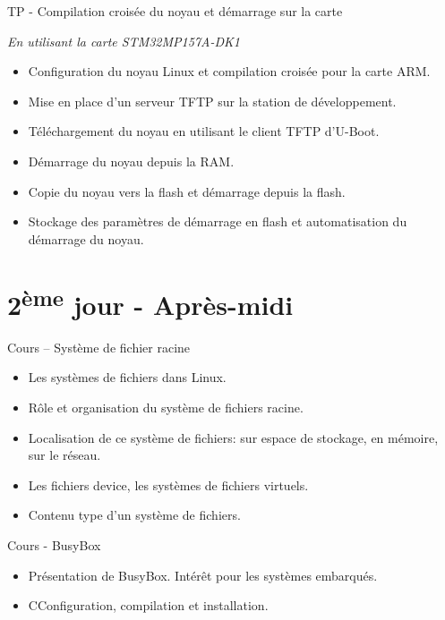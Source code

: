 \documentclass[a4paper,12pt,obeyspaces,spaces,hyphens]{article}
\begin{document}
\feagendaonecolumn
{TP - Compilation croisée du noyau et démarrage sur la carte}
{
  {\em En utilisant la carte STM32MP157A-DK1}
  \begin{itemize}
  \item Configuration du noyau Linux et compilation croisée pour la carte ARM.
  \item Mise en place d'un serveur TFTP sur la station de développement.
  \item Téléchargement du noyau en utilisant le client TFTP d'U-Boot.
  \item Démarrage du noyau depuis la RAM.
  \item Copie du noyau vers la flash et démarrage depuis la flash.
  \item Stockage des paramètres de démarrage en flash et automatisation
	du démarrage du noyau.
  \end{itemize}
}

\section{2\textsuperscript{ème} jour - Après-midi}

\feagendatwocolumn
{Cours – Système de fichier racine}
{
  \begin{itemize}
  \item Les systèmes de fichiers dans Linux.
  \item Rôle et organisation du système de fichiers racine.
  \item Localisation de ce système de fichiers: sur espace
	de stockage, en mémoire, sur le réseau.
  \item Les fichiers device, les systèmes de fichiers virtuels.
  \item Contenu type d'un système de fichiers.
  \end{itemize}
}
{Cours - BusyBox}
{
  \begin{itemize}
  \item Présentation de BusyBox. Intérêt pour les systèmes embarqués.
  \item CConfiguration, compilation et installation.
  \end{itemize}
}
\end{document}
